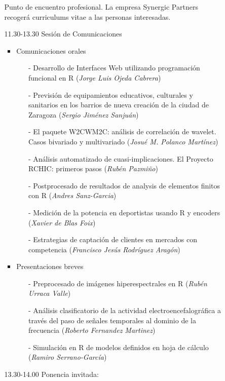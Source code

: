 \begin{itemize}
\begin{itemize}
\begin{itemize}
        Punto de encuentro profesional. 
        La empresa Synergic Partners recogerá curriculums vitae a las 
        personas interesadas.
    \item[]11.30-13.30 Sesión de Comunicaciones
    \begin{itemize}
    \item Comunicaciones orales
      \begin{enumerate}
      \item[-] Desarrollo de Interfaces Web utilizando programación 
      funcional en R (\emph{Jorge Luis Ojeda Cabrera})
      \item[-] Previsión de equipamientos educativos, culturales y sanitarios 
      en los barrios de nueva creación de la ciudad de Zaragoza 
      (\emph{Sergio Jiménez Sanjuán})
      \item[-] El paquete W2CWM2C: análisis de correlación de wavelet. 
      Casos bivariado y multivariado (\emph{Josué M. Polanco Martínez})
      \item[-] Análisis automatizado de cuasi-implicaciones. El Proyecto 
      RCHIC: primeros pasos (\emph{Rubén Pazmiño})
      \item[-] Postprocesado de resultados de analysis de elementos 
      finitos con R (\emph{Andres Sanz-Garcia})
      \item[-] Medición de la potencia en deportistas usando R y 
      encoders (\emph{Xavier de Blas Foix})
      \item[-] Estrategias de captación de clientes en mercados con 
      competencia (\emph{Francisco Jesús Rodríguez Aragón})
      \end{enumerate}
    \item  Presentaciones breves
      \begin{enumerate}
      \item[-] Preprocesado de imágenes hiperespectrales en R 
      (\emph{Rubén Urraca Valle})
      \item[-] Análisis clasificatorio de la actividad electroencefalográfica 
      a través del paso de señales temporales al dominio de la frecuencia 
      (\emph{Roberto Fernandez Martinez})
      \item[-] Simulación en R de modelos definidos en hoja de cálculo 
      (\emph{Ramiro Serrano-García})
      \end{enumerate}
    \end{itemize}
    \item[]13.30-14.00 Ponencia invitada:


\end{itemize}
\end{itemize}
\end{itemize}

